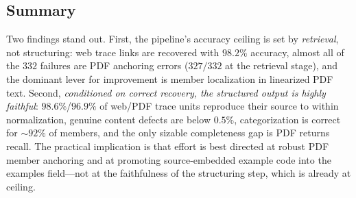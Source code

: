 \subsection{Summary}
\label{sec:eval-summary}
Two findings stand out. First, the pipeline's accuracy ceiling is set by
\emph{retrieval}, not structuring: web trace links are recovered with
$98.2\%$ accuracy, almost all of the $332$ failures are PDF anchoring errors
($327/332$ at the retrieval stage), and the dominant lever for improvement is
member localization in linearized PDF text. Second, \emph{conditioned on correct
recovery, the structured output is highly faithful}: $98.6\%$/$96.9\%$ of
web/PDF trace units reproduce their source to within normalization, genuine
content defects are below $0.5\%$, categorization is correct for $\sim 92\%$ of
members, and the only sizable completeness gap is PDF returns recall. The
practical implication is that effort is best directed at robust PDF member
anchoring and at promoting source-embedded example code into the examples
field---not at the faithfulness of the structuring step, which is already at
ceiling.
